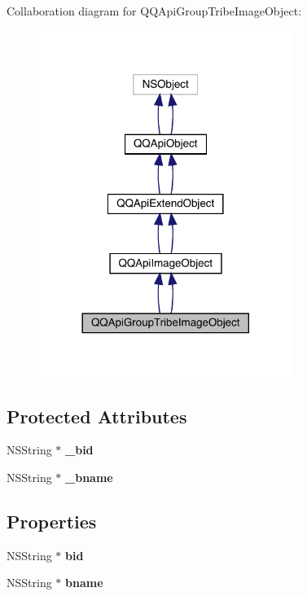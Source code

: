 Collaboration diagram for Q\+Q\+Api\+Group\+Tribe\+Image\+Object\+:\nopagebreak
\begin{figure}[H]
\begin{center}
\leavevmode
\includegraphics[width=233pt]{interface_q_q_api_group_tribe_image_object__coll__graph}
\end{center}
\end{figure}
\subsection*{Protected Attributes}
\begin{DoxyCompactItemize}
\item 
\mbox{\label{interface_q_q_api_group_tribe_image_object_ada46e3e51092e5e2109952bbc7f6febc}} 
N\+S\+String $\ast$ {\bfseries \+\_\+bid}
\item 
\mbox{\label{interface_q_q_api_group_tribe_image_object_a80a6525a665cde14a86b5311a8c95177}} 
N\+S\+String $\ast$ {\bfseries \+\_\+bname}
\end{DoxyCompactItemize}
\subsection*{Properties}
\begin{DoxyCompactItemize}
\item 
\mbox{\label{interface_q_q_api_group_tribe_image_object_aa8c46354fe41d453ab80b25febc3c529}} 
N\+S\+String $\ast$ {\bfseries bid}
\item 
\mbox{\label{interface_q_q_api_group_tribe_image_object_a0746b6a0e9135045cdc7a8a0f12e87ac}} 
N\+S\+String $\ast$ {\bfseries bname}
\end{DoxyCompactItemize}
